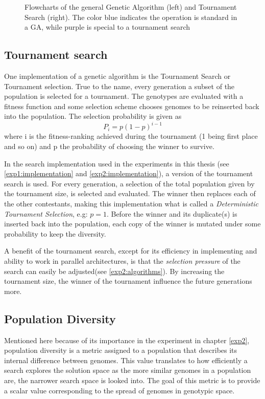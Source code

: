 \begin{figure}[h]
\begin{subfigure}[h]{0.25\linewidth}
    \end{subfigure}
    \caption[Algorithm flowcharts]{Flowcharts of the general Genetic Algorithm (left) and Tournament Search (right). The color blue indicates the operation is standard in a GA, while purple is special to a tournament search}
    \label{fig:algorithmflowcharts}
\end{figure}

\subsection{Tournament search}
One implementation of a genetic algorithm is the Tournament Search or Tournament selection. True to the name, every generation a subset of the population is selected for a tournament. The genotypes are evaluated with a fitness function and some selection scheme chooses genomes to be reinserted back into the population. The selection probability is given as 
\begin{equation}
    \label{eq:tournamentsearch}
    P_{i} = p(1-p)^{i-1}
\end{equation}
where i is the fitness-ranking achieved during the tournament (1 being first place and so on) and p the probability of choosing the winner to survive.  

In the search implementation used in the experiments in this thesis (see \ref{exp1:implementation} and \ref{exp2:implementation}), a version of the tournament search is used. For every generation, a selection of the total population given by the tournament size, is selected and evaluated. The winner then replaces each of the other contestants, making this implementation what is called a \textit{Deterministic Tournament Selection}, e.g: \(p=1\). Before the winner and its duplicate(s) is inserted back into the population, each copy of the winner is mutated under some probability to keep the diversity. 

A benefit of the tournament search, except for its efficiency in implementing and ability to work in parallel architectures, is that the \textit{selection pressure} of the search can easily be adjusted(see \ref{exp2:algorithms}). By increasing the tournament size, the winner of the tournament influence the future generations more.

\subsection{Population Diversity}
\label{background:diversity}
Mentioned here because of its importance in the experiment in chapter \ref{exp2}, population diversity is a metric assigned to a population that describes its internal difference between genomes. This value translates to how efficiently a search explores the solution space as the more similar genomes in a population are, the narrower search space is looked into. The goal of this metric is to provide a scalar value corresponding to the spread of genomes in genotypic space. 

